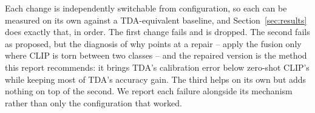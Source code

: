 Each change is independently switchable from configuration, so each can be measured on its
own against a TDA-equivalent baseline, and Section~\ref{sec:results} does exactly that, in
order. The first change fails and is dropped. The second fails as proposed, but the diagnosis
of why points at a repair -- apply the fusion only where CLIP is torn between two classes --
and the repaired version is the method this report recommends: it brings TDA's calibration
error below zero-shot CLIP's while keeping most of TDA's accuracy gain. The third helps on its
own but adds nothing on top of the second. We report each failure alongside its mechanism
rather than only the configuration that worked.
